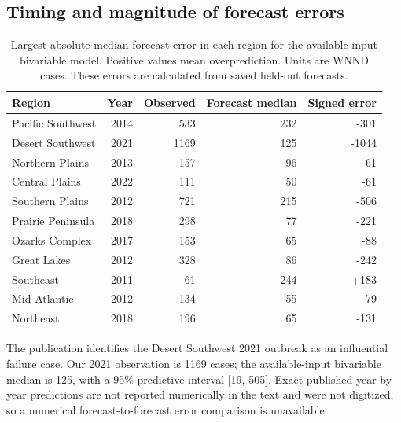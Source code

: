 \documentclass[11pt]{article}
\begin{document}
\subsection{Timing and magnitude of forecast errors}
\begin{table}[H]\centering\small\begin{tabular}{lrrrr}\toprule Region & Year & Observed & Forecast median & Signed error\\\midrule
Pacific Southwest & 2014 & 533 & 232 & -301 \\
Desert Southwest & 2021 & 1169 & 125 & -1044 \\
Northern Plains & 2013 & 157 & 96 & -61 \\
Central Plains & 2022 & 111 & 50 & -61 \\
Southern Plains & 2012 & 721 & 215 & -506 \\
Prairie Peninsula & 2018 & 298 & 77 & -221 \\
Ozarks Complex & 2017 & 153 & 65 & -88 \\
Great Lakes & 2012 & 328 & 86 & -242 \\
Southeast & 2011 & 61 & 244 & +183 \\
Mid Atlantic & 2012 & 134 & 55 & -79 \\
Northeast & 2018 & 196 & 65 & -131 \\
\bottomrule\end{tabular}\caption{Largest absolute median forecast error in each region for the available-input bivariable model. Positive values mean overprediction. Units are WNND cases. These errors are calculated from saved held-out forecasts.}\end{table}
The publication identifies the Desert Southwest 2021 outbreak as an influential failure case. Our 2021 observation is 1169 cases; the available-input bivariable median is 125, with a 95\% predictive interval [19, 505]. Exact published year-by-year predictions are not reported numerically in the text and were not digitized, so a numerical forecast-to-forecast error comparison is unavailable.
\end{document}
